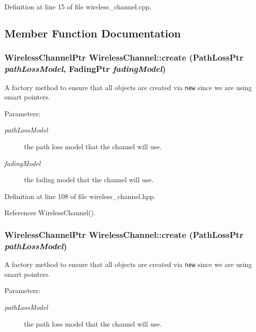 Definition at line 15 of file wireless\_\-channel.cpp.

\subsection{Member Function Documentation}
\subsubsection{\setlength{\rightskip}{0pt plus 5cm}\bf{Wireless\-Channel\-Ptr} Wireless\-Channel::create (Path\-Loss\-Ptr {\em path\-Loss\-Model}, Fading\-Ptr {\em fading\-Model})\hspace{0.3cm}{\tt  [inline, static]}}\label{classWirelessChannel_8c58b20240a8a0d54c9ba5ac02f6ce3c}


A factory method to ensure that all objects are created via {\tt new} since we are using smart pointers. 

\begin{Desc}
\item[Parameters:]
\begin{description}
\item[{\em path\-Loss\-Model}]the path loss model that the channel will use. \item[{\em fading\-Model}]the fading model that the channel will use. \end{description}
\end{Desc}


Definition at line 108 of file wireless\_\-channel.hpp.

References Wireless\-Channel().
\subsubsection{\setlength{\rightskip}{0pt plus 5cm}\bf{Wireless\-Channel\-Ptr} Wireless\-Channel::create (Path\-Loss\-Ptr {\em path\-Loss\-Model})\hspace{0.3cm}{\tt  [inline, static]}}\label{classWirelessChannel_111126e58d9d50d8e262bd1721b495e4}


A factory method to ensure that all objects are created via {\tt new} since we are using smart pointers. 

\begin{Desc}
\item[Parameters:]
\begin{description}
\item[{\em path\-Loss\-Model}]the path loss model that the channel will use. \end{description}
\end{Desc}


